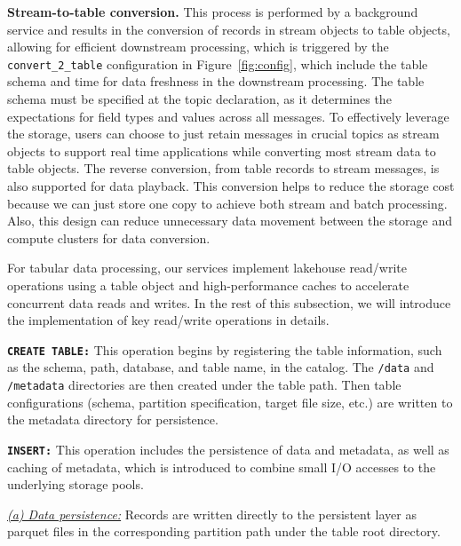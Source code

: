 \noindent \textbf{Stream-to-table conversion.} This process is performed by a background service and results in the conversion of records in stream objects to table objects, allowing for efficient downstream processing, which is triggered by the \texttt{convert\_2\_table} configuration in Figure~\ref{fig:config}, which include the table schema and time for data freshness in the downstream processing.  The table schema must be specified at the topic declaration, as it determines the expectations for field types and values across all messages. 
 To effectively leverage the storage, users  can choose to just retain messages in crucial topics as stream objects  to support real time applications while converting most stream data to table objects.  The reverse conversion, from table records to stream messages, is also supported for data playback. 
 This conversion helps to reduce the storage cost because we can just store one copy to achieve both stream and batch processing. Also, this design can reduce unnecessary data movement between the storage and compute clusters for data conversion.




For tabular data processing, our \sys services implement lakehouse read/write operations using a table object and high-performance caches to accelerate concurrent data reads and writes. In the rest of this subsection, we will introduce the implementation of key read/write operations in details.

\noindent \textbf{\texttt{CREATE TABLE:}} This operation begins by registering the table information, such as the schema, path, database, and table name, in the catalog. The \texttt{/data} and \texttt{/metadata} directories are then created under the table path. Then table configurations (schema, partition specification, target file size, etc.) are written to the metadata directory for persistence.



\noindent \textbf{\texttt{INSERT:}} This operation includes the persistence of data and metadata, as well as caching of metadata, which is introduced to combine small I/O accesses to the underlying storage pools.

\noindent \underline{\textit{(a) Data persistence:}} Records are written directly to the persistent layer as parquet files in the corresponding partition path under the table root directory.


